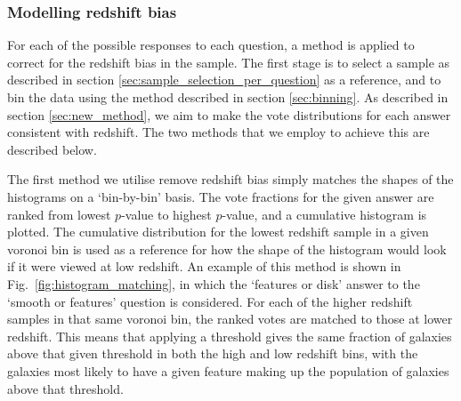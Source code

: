 \documentclass[useAMS,usenatbib]{mn2e}
\begin{document}
\subsubsection{Modelling redshift bias}
\label{sec:debiasing}

For each of the possible responses to each question, a method is applied to correct for the redshift bias in the sample. The first stage is to select a sample as described in section \ref{sec:sample_selection_per_question} as a reference, and to bin the data using the method described in section \ref{sec:binning}. As described in section \ref{sec:new_method}, we aim to make the vote distributions for each answer consistent with redshift. The two methods that we employ to achieve this are described below. 

The first method we utilise remove redshift bias simply matches the shapes of the histograms on a `bin-by-bin' basis. The vote fractions for the given answer are ranked from lowest $p$-value to highest $p$-value, and a cumulative histogram is plotted. The cumulative distribution for the lowest redshift sample in a given voronoi bin is used as a reference for how the shape of the histogram would look if it were viewed at low redshift. An example of this method is shown in Fig.~\ref{fig:histogram_matching}, in which the `features or disk' answer to the `smooth or features' question is considered. For each of the higher redshift samples in that same voronoi bin, the ranked votes are matched to those at lower redshift. This means that applying a threshold gives the same fraction of galaxies above that given threshold in both the high and low redshift bins, with the galaxies most likely to have a given feature making up the population of galaxies above that threshold. 
\end{document}
